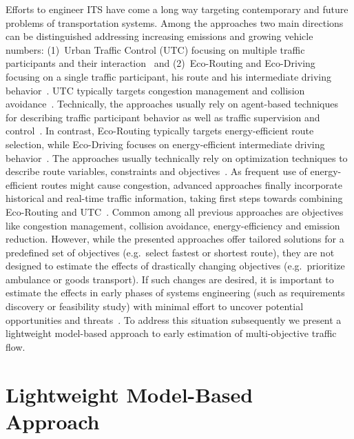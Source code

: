 \documentclass[conference]{../cls/IEEEtran}
\begin{document}
Efforts to engineer ITS have come a long way targeting contemporary and future
problems of transportation systems. Among the approaches two main directions can
be distinguished addressing increasing emissions and growing vehicle numbers:
(1)~Urban Traffic Control (UTC) focusing on multiple traffic participants and
their interaction~\cite{Chen2010} and (2)~Eco-Routing and Eco-Driving focusing
on a single traffic participant, his route and his intermediate driving
behavior~\cite{Ericsson2006,Boriboonsomsin2012}. UTC typically targets
congestion management and collision avoidance~\cite{Chen2010}. Technically, the
approaches usually rely on agent-based techniques for describing traffic
participant behavior as well as traffic supervision and control~\cite{Chen2010}.
In contrast, Eco-Routing typically targets energy-efficient route selection,
while Eco-Driving focuses on energy-efficient intermediate driving
behavior~\cite{Ericsson2006}. The approaches usually technically rely on
optimization techniques to describe route variables, constraints and
objectives~\cite{Ericsson2006}. As frequent use of energy-efficient routes might
cause congestion, advanced approaches finally incorporate historical and
real-time traffic information, taking first steps towards combining
Eco-Routing and UTC~\cite{Boriboonsomsin2012}. 
Common among all previous approaches are objectives like congestion management, collision avoidance, energy-efficiency and emission reduction. However, while the presented approaches offer tailored solutions for a predefined set of objectives (e.g.\ select fastest or shortest route), they are not designed to estimate the effects of drastically changing objectives (e.g.\ prioritize ambulance or goods transport). If such changes are desired, it is important to estimate the effects in early phases of systems engineering (such as requirements discovery or feasibility study) with minimal effort to uncover potential opportunities and threats~\cite{Whitten2005}. To address this situation subsequently we present a lightweight model-based approach to early estimation of multi-objective traffic flow.

\section{Lightweight Model-Based Approach}
\label{sec:approach}
\end{document}
